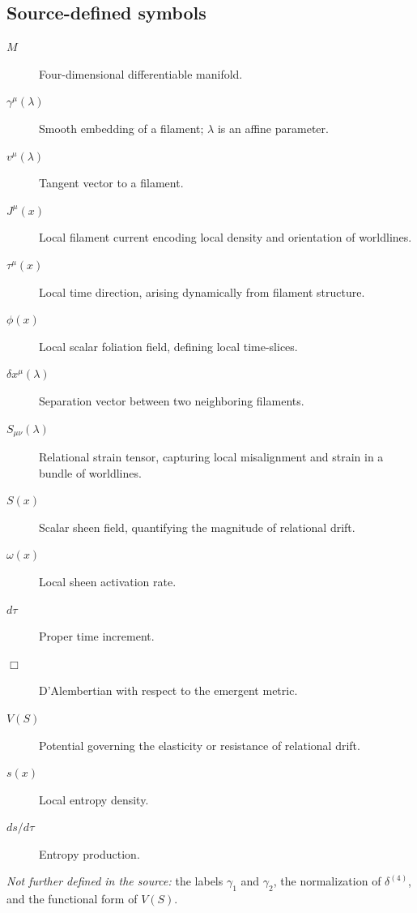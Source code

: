 \documentclass[10pt]{article}
\begin{document}
\subsection*{Source-defined symbols}
\begin{description}
\item[$M$] Four-dimensional differentiable manifold.
\item[$\gamma^\mu(\lambda)$] Smooth embedding of a filament; $\lambda$ is an affine parameter.
\item[$v^\mu(\lambda)$] Tangent vector to a filament.
\item[$J^\mu(x)$] Local filament current encoding local density and orientation of worldlines.
\item[$\tau^\mu(x)$] Local time direction, arising dynamically from filament structure.
\item[$\phi(x)$] Local scalar foliation field, defining local time-slices.
\item[$\delta x^\mu(\lambda)$] Separation vector between two neighboring filaments.
\item[$S_{\mu\nu}(\lambda)$] Relational strain tensor, capturing local misalignment and strain in a bundle of worldlines.
\item[$S(x)$] Scalar sheen field, quantifying the magnitude of relational drift.
\item[$\omega(x)$] Local sheen activation rate.
\item[$d\tau$] Proper time increment.
\item[$\Box$] D'Alembertian with respect to the emergent metric.
\item[$V(S)$] Potential governing the elasticity or resistance of relational drift.
\item[$s(x)$] Local entropy density.
\item[$ds/d\tau$] Entropy production.
\end{description}
\textit{Not further defined in the source:} the labels $\gamma_1$ and $\gamma_2$, the normalization of $\delta^{(4)}$, and the functional form of $V(S)$.
\end{document}
